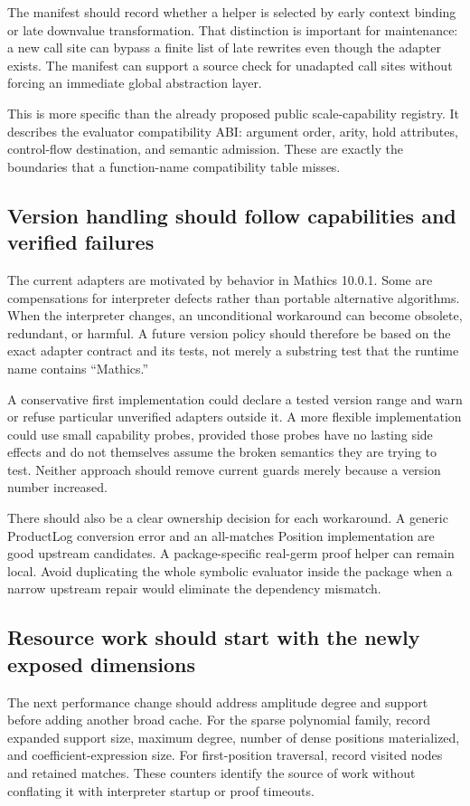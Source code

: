 \documentclass[11pt,a4paper]{article}
\begin{document}
The manifest should record whether a helper is selected by early context binding or late downvalue transformation. That distinction is important for maintenance: a new call site can bypass a finite list of late rewrites even though the adapter exists. The manifest can support a source check for unadapted call sites without forcing an immediate global abstraction layer.

This is more specific than the already proposed public scale-capability registry. It describes the evaluator compatibility ABI: argument order, arity, hold attributes, control-flow destination, and semantic admission. These are exactly the boundaries that a function-name compatibility table misses.

\subsection{Version handling should follow capabilities and verified failures}
The current adapters are motivated by behavior in Mathics 10.0.1. Some are compensations for interpreter defects rather than portable alternative algorithms. When the interpreter changes, an unconditional workaround can become obsolete, redundant, or harmful. A future version policy should therefore be based on the exact adapter contract and its tests, not merely a substring test that the runtime name contains ``Mathics.''\cite{mathicsguide,compat,coreentry}

A conservative first implementation could declare a tested version range and warn or refuse particular unverified adapters outside it. A more flexible implementation could use small capability probes, provided those probes have no lasting side effects and do not themselves assume the broken semantics they are trying to test. Neither approach should remove current guards merely because a version number increased.

There should also be a clear ownership decision for each workaround. A generic ProductLog conversion error and an all-matches Position implementation are good upstream candidates. A package-specific real-germ proof helper can remain local. Avoid duplicating the whole symbolic evaluator inside the package when a narrow upstream repair would eliminate the dependency mismatch.

\subsection{Resource work should start with the newly exposed dimensions}
The next performance change should address amplitude degree and support before adding another broad cache. For the sparse polynomial family, record expanded support size, maximum degree, number of dense positions materialized, and coefficient-expression size. For first-position traversal, record visited nodes and retained matches. These counters identify the source of work without conflating it with interpreter startup or proof timeouts.
\end{document}

